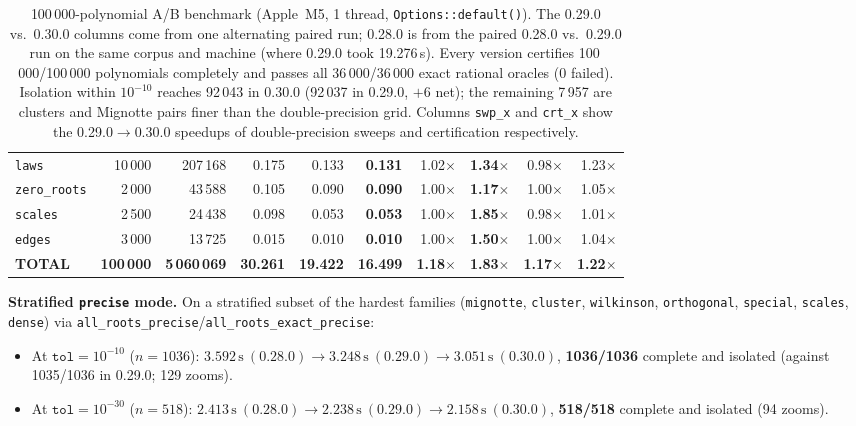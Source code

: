 \documentclass[10pt,a4paper]{article}
\theoremstyle{definition}
\numberwithin{equation}{section}
\begin{document}
\begin{table}[H]
\begin{tabular}{lrrrrrrrrr}
\texttt{laws}         & 10\,000 &    207\,168 & 0.175 & 0.133 & \textbf{0.131} & 1.02$\times$ & \textbf{1.34$\times$} & 0.98$\times$ & 1.23$\times$\\
\texttt{zero\_roots}  &  2\,000 &     43\,588 & 0.105 & 0.090 & \textbf{0.090} & 1.00$\times$ & \textbf{1.17$\times$} & 1.00$\times$ & 1.05$\times$\\
\texttt{scales}       &  2\,500 &     24\,438 & 0.098 & 0.053 & \textbf{0.053} & 1.00$\times$ & \textbf{1.85$\times$} & 0.98$\times$ & 1.01$\times$\\
\texttt{edges}        &  3\,000 &     13\,725 & 0.015 & 0.010 & \textbf{0.010} & 1.00$\times$ & \textbf{1.50$\times$} & 1.00$\times$ & 1.04$\times$\\
\midrule
\textbf{TOTAL} & \textbf{100\,000} & \textbf{5\,060\,069} & \textbf{30.261} & \textbf{19.422} & \textbf{16.499} & \textbf{1.18$\times$} & \textbf{1.83$\times$} & \textbf{1.17$\times$} & \textbf{1.22$\times$}\\
\bottomrule
\end{tabular}
\caption{100\,000-polynomial A/B benchmark (Apple~M5, 1 thread, \texttt{Options::default()}). The 0.29.0 vs.\ 0.30.0 columns come from one alternating paired run; 0.28.0 is from the paired 0.28.0 vs.\ 0.29.0 run on the same corpus and machine (where 0.29.0 took 19.276\,s). Every version certifies 100\,000/100\,000 polynomials completely and passes all 36\,000/36\,000 exact rational oracles (0 failed). Isolation within $10^{-10}$ reaches 92\,043 in 0.30.0 (92\,037 in 0.29.0, $+6$ net); the remaining 7\,957 are clusters and Mignotte pairs finer than the double-precision grid. Columns \texttt{swp\_x} and \texttt{crt\_x} show the 0.29.0$\to$0.30.0 speedups of double-precision sweeps and certification respectively.}\label{tab:100k}
\end{table}

\textbf{Stratified \texttt{precise} mode.}
On a stratified subset of the hardest families (\texttt{mignotte}, \texttt{cluster}, \texttt{wilkinson}, \texttt{orthogonal}, \texttt{special}, \texttt{scales}, \texttt{dense}) via \texttt{all\_roots\_precise}/\texttt{all\_roots\_exact\_precise}:
\begin{itemize}
\item At $\texttt{tol}=10^{-10}$ ($n=1036$): $3.592\,\mathrm{s}\ (0.28.0) \to 3.248\,\mathrm{s}\ (0.29.0) \to \mathbf{3.051\,\mathrm{s}}\ (0.30.0)$, \textbf{1036/1036} complete and isolated (against 1035/1036 in 0.29.0; 129 zooms).
\item At $\texttt{tol}=10^{-30}$ ($n=518$): $2.413\,\mathrm{s}\ (0.28.0) \to 2.238\,\mathrm{s}\ (0.29.0) \to \mathbf{2.158\,\mathrm{s}}\ (0.30.0)$, \textbf{518/518} complete and isolated (94 zooms).
\end{itemize}
\end{document}

